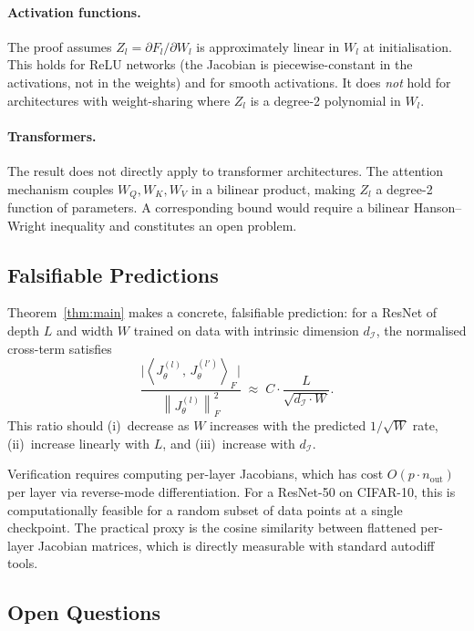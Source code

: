 \documentclass[11pt]{article}
\theoremstyle{plain}
\theoremstyle{definition}
\theoremstyle{remark}
\newcommand{\norm}[1]{\left\|#1\right\|}
\newcommand{\inner}[2]{\left\langle #1,\, #2 \right\rangle}
\newcommand{\dI}{d_{\mathcal{I}}}
\begin{document}
\paragraph{Activation functions.}
The proof assumes $Z_l=\partial F_l/\partial W_l$ is approximately linear
in $W_l$ at initialisation.  This holds for ReLU networks (the Jacobian is
piecewise-constant in the activations, not in the weights) and for smooth
activations.  It does \emph{not} hold for architectures with weight-sharing
where $Z_l$ is a degree-2 polynomial in $W_l$.

\paragraph{Transformers.}
The result does not directly apply to transformer architectures.
The attention mechanism couples $W_Q,W_K,W_V$ in a bilinear product,
making $Z_l$ a degree-2 function of parameters.  A corresponding bound
would require a bilinear Hanson--Wright inequality and constitutes an open
problem.

\subsection{Falsifiable Predictions}

Theorem~\ref{thm:main} makes a concrete, falsifiable prediction: for a
ResNet of depth $L$ and width $W$ trained on data with intrinsic dimension
$\dI$, the normalised cross-term satisfies
\begin{equation}
\label{eq:prediction}
  \frac{\bigl|\inner{J_\theta^{(l)}}{J_\theta^{(l')}}_F\bigr|}
       {\norm{J_\theta^{(l)}}_F^2}
  \;\approx\;
  C\cdot\frac{L}{\sqrt{\dI\cdot W}}.
\end{equation}
This ratio should (i)~decrease as $W$ increases with the predicted
$1/\sqrt{W}$ rate, (ii)~increase linearly with $L$, and
(iii)~increase with $\dI$.

Verification requires computing per-layer Jacobians, which has cost
$O(p\cdot n_{\mathrm{out}})$ per layer via reverse-mode differentiation.
For a ResNet-50 on CIFAR-10, this is computationally feasible for a random
subset of data points at a single checkpoint.  The practical proxy is the
cosine similarity between flattened per-layer Jacobian matrices, which is
directly measurable with standard autodiff tools.

\subsection{Open Questions}
\end{document}

